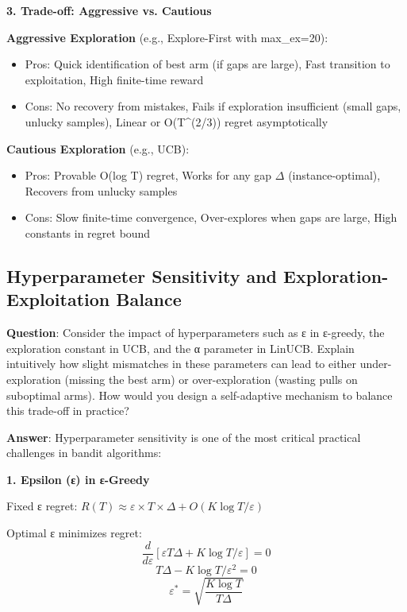 \documentclass[12pt]{article}
\begin{document}
{{{\textbf{3. Trade-off: Aggressive vs. Cautious}

\textbf{Aggressive Exploration} (e.g., Explore-First with max_ex=20):
\begin{itemize}
\item Pros: Quick identification of best arm (if gaps are large), Fast transition to exploitation, High finite-time reward
\item Cons: No recovery from mistakes, Fails if exploration insufficient (small gaps, unlucky samples), Linear or O(T^(2/3)) regret asymptotically
\end{itemize}

\textbf{Cautious Exploration} (e.g., UCB):
\begin{itemize}
\item Pros: Provable O(log T) regret, Works for any gap $\Delta$ (instance-optimal), Recovers from unlucky samples
\item Cons: Slow finite-time convergence, Over-explores when gaps are large, High constants in regret bound
\end{itemize}

\subsection{Hyperparameter Sensitivity and Exploration-Exploitation Balance}

\textbf{Question}: Consider the impact of hyperparameters such as ε in ε-greedy, the exploration constant in UCB, and the α parameter in LinUCB. Explain intuitively how slight mismatches in these parameters can lead to either under-exploration (missing the best arm) or over-exploration (wasting pulls on suboptimal arms). How would you design a self-adaptive mechanism to balance this trade-off in practice?

\textbf{Answer}: Hyperparameter sensitivity is one of the most critical practical challenges in bandit algorithms:

\textbf{1. Epsilon (ε) in ε-Greedy}

Fixed ε regret: $R(T) \approx \varepsilon \times T \times \Delta + O(K \log T / \varepsilon)$

Optimal ε minimizes regret:
\begin{equation}
\frac{d}{d\varepsilon} [\varepsilon T \Delta + K \log T / \varepsilon] = 0
\end{equation}
\begin{equation}
T \Delta - K \log T / \varepsilon^2 = 0
\end{equation}
\begin{equation}
\varepsilon^* = \sqrt{\frac{K \log T}{T \Delta}}
\end{equation}

}}}
\end{document}
